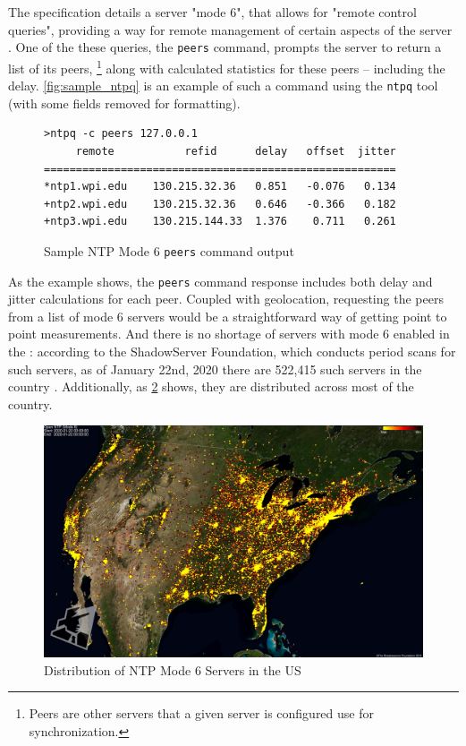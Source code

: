 The \ntp specification details a server "mode 6", that allows for "remote control queries", providing a way for remote management of certain aspects of the server \cite{Haberman2019Control4}. One of the these queries, the \texttt{peers} command, prompts the server to return a list of its peers, \footnote{Peers are other \ntp servers that a given server is configured use for synchronization.} along with calculated statistics for these peers -- including the delay. \autoref{fig:sample_ntpq} is an example of such a command using the \texttt{ntpq} tool (with some fields removed for formatting).

\begin{figure}[h]
    \centering
    \begin{minipage}{0.75\textwidth}
    \begin{verbatim}
>ntpq -c peers 127.0.0.1
     remote           refid      delay   offset  jitter
=======================================================
*ntp1.wpi.edu    130.215.32.36   0.851   -0.076   0.134
+ntp2.wpi.edu    130.215.32.36   0.646   -0.366   0.182
+ntp3.wpi.edu    130.215.144.33  1.376    0.711   0.261
    \end{verbatim}
    \end{minipage}
    \caption{Sample NTP Mode 6 \texttt{peers} command output}
    \label{fig:sample_ntpq}
\end{figure}

As the example shows, the \texttt{peers} command response includes both delay and jitter calculations for each peer. Coupled with \ip geolocation, requesting the peers from a list of mode 6 \ntp servers would be a straightforward way of getting point to point measurements. And there is no shortage of \ntp servers with mode 6 enabled in the \us: according to the ShadowServer Foundation, which conducts period scans for such servers, as of January 22nd, 2020 there are 522,415 such servers in the country \cite{TheShadowserverFoundationNTPProject}. Additionally, as \cref{fig:ntp_mode_6_us_map} shows, they are distributed across most of the country.

\begin{figure}[h]
    \centering
    \includegraphics{images/ntpversion_united_states_current.jpg}
    \caption{Distribution of NTP Mode 6 Servers in the US \cite{TheShadowserverFoundationNTPProject}}
    \label{fig:ntp_mode_6_us_map}
\end{figure}

